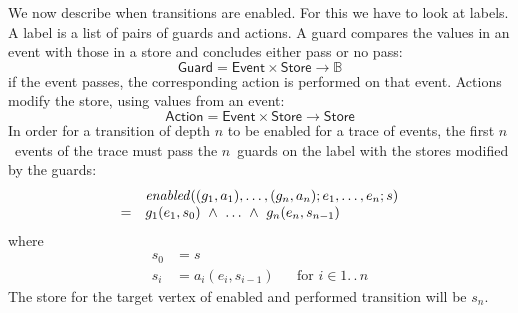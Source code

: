 \documentclass[10pt]{llncs} %
\newcommand{\B}{\ensuremath{\mathbb{B}}}
\newcommand{\set}[1]{\ensuremath{\mathsf{#1}}}
\newcommand{\functionfont}[1]{\mathit{#1}}
\newcommand{\enabled}{\functionfont{enabled}}
\begin{document}
We now describe when transitions are enabled. For this we have to look
at labels. A label is a list of pairs of guards and actions. A
guard compares the values in an event with those in a store and
concludes either pass or no pass:
\[
\set{Guard} =\set{Event}\times\set{Store} \to \B
\]
if the event passes, the corresponding action is performed on that event.
Actions modify the store, using values from an event:
\[
\set{Action} = \set{Event}\times\set{Store}\to\set{Store}
\]
In order for a transition of depth $n$ to be enabled for a trace of
events, the first $n$~events of the trace must pass the $n$~guards
on the label with the stores modified by the guards:
\[
\begin{array}{c l}
& \enabled((g_1, a_1), \ldots, (g_n, a_n); e_1, \ldots, e_n; s) \\
 = &
g_1(e_1, s_0)\ \land\ \ldots\ \land\ g_n(e_n, s_{n-1}) 
\end{array}
\]
where
\begin{align}
  s_0 &=  s \\
  s_i &= a_i(e_i, s_{i-1}) &&\text{for $i\in1.\,.\,n$}
\end{align}
The store for the target vertex of enabled and performed transition will be $s_n$.
\end{document}
